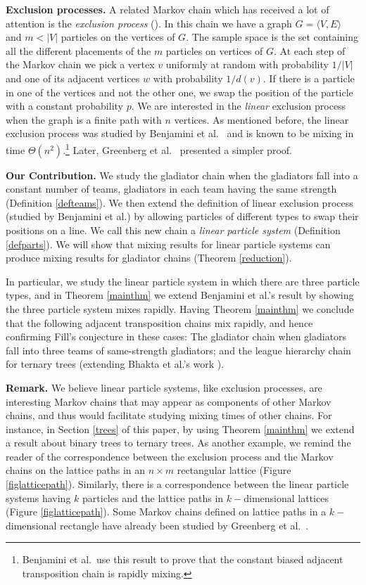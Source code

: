 \documentclass[10 pt]{article}
\begin{document}
\textbf{Exclusion processes.} A related Markov chain which has received a lot of attention is the \emph{exclusion process} (\cite{exc1, exc2}).
In this chain we have a graph  $G= \langle V, E\rangle$  and  $m< \vert V\vert$ particles  on the vertices of $G$. The sample space is the
set containing all the different placements of the $m$ particles on vertices of $G$. At each step of the Markov chain we pick a vertex $v$
uniformly at random with probability  $1/\vert V \vert$ and  one of its adjacent vertices $w$ with probability  $1/d(v)$. If there is a
particle in one of the vertices and not the other one, we swap the position of the particle with a constant probability $p$. We are interested
in the \emph{linear} exclusion process when the graph is a finite path with $n$ vertices.  As mentioned before, the linear exclusion process
was studied by Benjamini et al.\ \cite{Benjamini} and is known to be mixing in time $\Theta(n^2)$.\footnote{Benjamini et al.\ use this
result to prove that the constant biased adjacent transposition chain is rapidly mixing.} Later, Greenberg et al.\ \cite{Greenberg}
presented a simpler proof. 

 \medskip
\textbf{Our Contribution.}
We study the gladiator chain when the gladiators fall into a constant number of teams, gladiators in each team having the same strength
(Definition \ref{defteams}).  We then extend the definition of linear exclusion process (studied by Benjamini et al.) by allowing particles
of different types to swap their positions on a line. We call this new chain a \emph{linear particle system} (Definition \ref{defparts}).
We will show that mixing results for linear particle systems can produce mixing results for gladiator chains (Theorem \ref{reduction}). 

In particular, we study the linear particle system in which there are three particle types, and in Theorem \ref{mainthm} we extend
Benjamini et al.'s result by  showing the three particle system mixes rapidly. Having Theorem \ref{mainthm} we conclude that the
following adjacent transposition chains mix rapidly, and hence confirming Fill's conjecture in these cases: The gladiator chain
when gladiators fall into three teams of same-strength gladiators; and the league hierarchy chain for ternary trees
(extending Bhakta et al.'s work \cite{Dana}). 
\medskip

\textbf{Remark.} We believe linear particle systems, like exclusion processes, are interesting Markov chains that may appear as components
of other Markov chains, and thus would facilitate studying mixing times of other chains. For instance, in Section \ref{trees} of this paper,
by using Theorem \ref{mainthm} we extend a result about binary trees to ternary trees.  As another example, we remind the reader of the
correspondence between the exclusion process and the Markov chains on the lattice paths in an $n\times m$ rectangular lattice
(Figure \ref{figlatticepath}). Similarly, there is a correspondence between the linear particle systems having $k$ particles and the lattice
paths in $k-$dimensional lattices (Figure \ref{figlatticepath}). Some Markov chains defined on lattice paths in a $k-$dimensional rectangle
have already been studied by Greenberg et al.\ \cite{Greenberg}.
\end{document}
